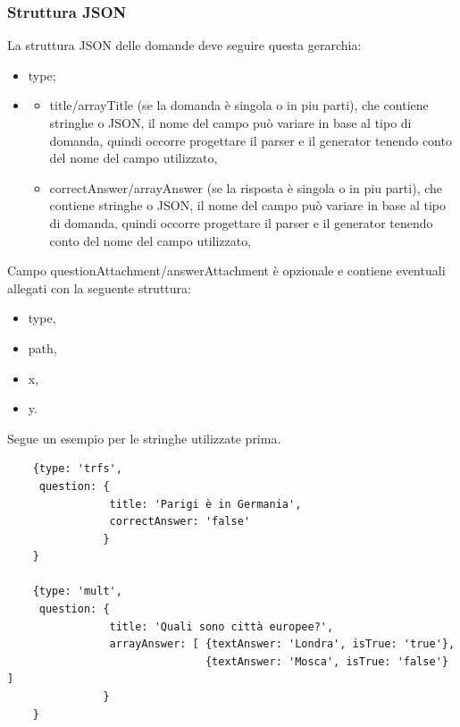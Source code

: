 \documentclass[a4paper, titlepage]{article}
\begin{document}
	\subsubsection{Struttura JSON}
	\label{qson}
	La struttura JSON delle domande deve seguire questa gerarchia:
	\begin{itemize}
		\item type;
		\item \begin{itemize}
			\item title/arrayTitle (se la domanda è singola o in piu parti), che contiene stringhe o JSON, il nome del campo può variare in base al tipo di domanda, quindi occorre progettare il parser e il generator tenendo conto del nome del campo utilizzato,
			\item correctAnswer/arrayAnswer (se la risposta è singola o in piu parti), che contiene stringhe o JSON, il nome del campo può variare in base al tipo di domanda, quindi occorre progettare il parser e il generator tenendo conto del nome del campo utilizzato,
		\end{itemize}
	\end{itemize}
	Campo questionAttachment/answerAttachment è opzionale e contiene eventuali allegati con la seguente struttura:
	\begin{itemize}
		\item type,
		\item path,
		\item x,
		\item y.
	\end{itemize}
	Segue un esempio per le stringhe utilizzate prima.
	\begin{verbatim}
	{type: 'trfs',
	 question: {
	            title: 'Parigi è in Germania',
	            correctAnswer: 'false'
	           }	
	}
	
	{type: 'mult',
	 question: {
	            title: 'Quali sono città europee?',
	            arrayAnswer: [ {textAnswer: 'Londra', isTrue: 'true'},
	                           {textAnswer: 'Mosca', isTrue: 'false'} ]
	           }	
	}
	\end{verbatim}
	
\end{document}
